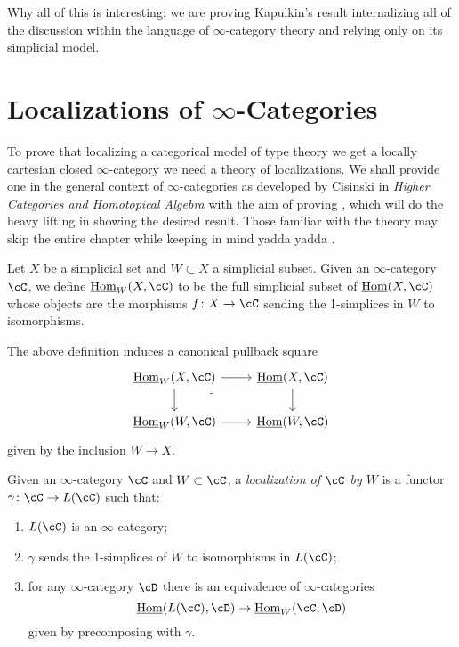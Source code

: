 \documentclass[a4paper,12pt]{scrartcl}
\begin{document}
Why all of this is interesting: we are proving Kapulkin's result internalizing
all of the discussion within the language of $\infty$-category theory and
relying only on its simplicial model.

\section{Localizations of \texorpdfstring{$\infty$}{∞}-Categories}

To prove that localizing a categorical model of type theory we get a locally
cartesian closed $\infty$-category we need a theory of localizations. We shall
provide one in the general context of $\infty$-categories as developed by
Cisinski in \emph{Higher Categories and Homotopical Algebra} with the aim of
proving \cite[Thm.\ 7.6.16]{Cis19}, which will do the heavy lifting in showing
the desired result. Those familiar with the theory may skip the entire chapter
while keeping in mind yadda yadda .

\begin{defn}
  Let $X$ be a simplicial set and $W\subset X$ a simplicial subset. Given an
  $\infty$-category $\cC$, we define $\Home_W(X,\cC)$ to be the full simplicial
  subset of $\Home(X,\cC)$ whose objects are the morphisms $f\colon
  X\rightarrow\cC$ sending the 1-simplices in $W$ to isomorphisms.
\end{defn}

\begin{rmk}
  The above definition induces a canonical pullback square
  \[\begin{tikzcd}
    {\Home_W(X,\cC)} & {\Home(X,\cC)} \\
    {\Home_W(W,\cC)} & {\Home(W,\cC)}
    \arrow[from=1-1, to=2-1]
    \arrow[from=2-1, to=2-2]
    \arrow[from=1-2, to=2-2]
    \arrow[from=1-1, to=1-2]
    \arrow["\lrcorner"{anchor=center, pos=0.125}, draw=none, from=1-1, to=2-2]
  \end{tikzcd}\]
  given by the inclusion $W\rightarrow X$.
\end{rmk}

\begin{defn}
  Given an $\infty$-category $\cC$ and $W\subset\cC$, a \emph{localization of
  $\cC$ by $W$} is a functor $\gamma\colon\cC\rightarrow L(\cC)$ such that:
  \begin{enumerate}
    \item $L(\cC)$ is an $\infty$-category;
    \item $\gamma$ sends the 1-simplices of $W$ to isomorphisms in $L(\cC)$;
    \item for any $\infty$-category $\cD$ there is an equivalence of
      $\infty$-categories
      \[\Home(L(\cC),\cD)\rightarrow\Home_W(\cC,\cD)\]
      given by precomposing with $\gamma$.
  \end{enumerate}
\end{defn}
\end{document}
